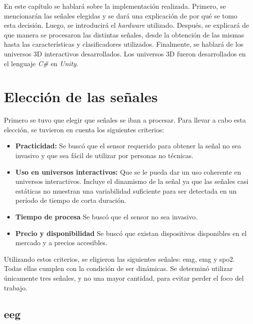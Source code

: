 En este capítulo se hablará sobre la implementación realizada. Primero, se mencionarán las señales elegidas y se dará una explicación de por qué se tomo esta decisión. Luego, se introducirá el \emph{hardware} utilizado. Después, se explicará de que manera se procesaron las distintas señales, desde la obtención de las mismas hasta las características y clasificadores utilizados. Finalmente, se hablará de los universos 3D interactivos desarrollados. Los universos 3D fueron desarrollados en el lenguaje \emph{C\#} en \emph{Unity}.

\section{Elección de las señales}

Primero se tuvo que elegir que señales se iban a procesar. Para llevar a cabo esta elección, se tuvieron en cuenta los siguientes criterios:

\begin{itemize}
\item \textbf{Practicidad:} Se buscó que el sensor requerido para obtener la señal no sea invasivo y que sea fácil de utilizar por personas no técnicas.
\item \textbf{Uso en universos interactivos:} Que se le pueda dar un uso coherente en universos interactivos. Incluye el dinamismo de la señal ya que las señales casi estáticas no muestran una variabilidad suficiente para ser detectada en un período de tiempo de corta duración.
\item \textbf{Tiempo de procesa} Se buscó que el sensor no sea invasivo.
\item \textbf{Precio y disponibilidad} Se buscó que existan dispositivos disponibles en el mercado y a precios accesibles.
\end{itemize}

Utilizando estos criterios, se eligieron las siguientes señales: \acrshort{emg}, \acrshort{emg} y \acrshort{spo2}. Todas ellas cumplen con la condición de ser dinámicas. Se determinó utilizar únicamente tres señales, y no una mayor cantidad, para evitar perder el foco del trabajo.

\subsection{\acrshort{eeg}}


